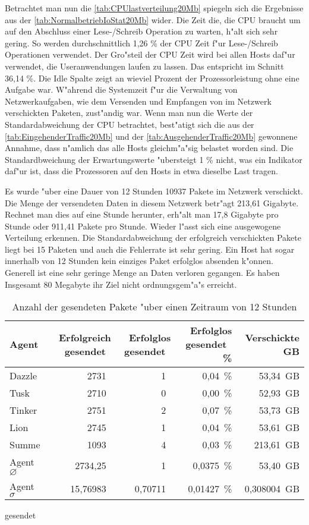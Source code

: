 Betrachtet man nun die \cref{tab:CPUlastverteilung20Mb} spiegeln sich die Ergebnisse aus der \cref{tab:NormalbetriebIoStat20Mb} wider. %
Die Zeit die, die CPU braucht um auf den Abschluss einer Lese-/Schreib Operation zu warten, h"alt sich sehr gering. %
So werden durchschnittlich 1,26 \% der CPU Zeit f"ur Lese-/Schreib Operationen verwendet. Der Gro"steil der CPU Zeit wird %
bei allen Hosts daf"ur verwendet, die Useranwendungen laufen zu lassen. Das entspricht im Schnitt 36,14 \%. Die Idle Spalte zeigt an wieviel Prozent der Prozessorleistung %
ohne eine Aufgabe war. W"ahrend die Systemzeit f"ur die Verwaltung von Netzwerkaufgaben, wie dem Versenden und Empfangen von %
im Netzwerk verschickten Paketen, zust"andig war. %
Wenn man nun die Werte der Standardabweichung der CPU betrachtet, best"atigt sich die aus der%
\cref{tab:EingehenderTraffic20Mb} und der \cref{tab:AusgehenderTraffic20Mb} gewonnene Annahme, dass n"amlich das alle Hosts gleichm"a"sig belastet worden sind. %
Die Standardbweichung der Erwartungswerte "ubersteigt 1 \% nicht, was ein Indikator daf"ur ist, dass die %
Prozessoren auf den Hosts in etwa dieselbe Last tragen.  

Es wurde "uber eine Dauer von 12 Stunden 10937 Pakete im Netzwerk verschickt. Die Menge der versendeten Daten in diesem Netzwerk betr"agt 213,61 Gigabyte. %
Rechnet man dies auf eine Stunde herunter, erh"alt man 17,8 Gigabyte pro Stunde oder 911,41 Pakete pro Stunde. Wieder l"asst sich eine ausgewogene Verteilung erkennen. %
Die Standardabweichung der erfolgreich verschickten Pakete liegt bei 15 Paketen und auch die Fehlerrate ist sehr gering. Ein Host %
hat sogar innerhalb von 12 Stunden kein einziges Paket erfolglos absenden k"onnen. Generell ist eine sehr geringe Menge an Daten verloren %
gegangen. Es haben Insgesamt 80 Megabyte ihr Ziel nicht ordnungsgem"a"s erreicht. %
\begin{table}
\centering
\begin{tabular}{l%
 r<{\,}%
 r<{\,}%
 r<{\,\%}%
 r<{\,GB}%
}
Agent  				& Erfolgreich gesendet			& Erfolglos gesendet			& Erfolglos gesendet	& Verschickte	\\
\hline
Dazzle 				& 2731			 		& 1					& 0,04			& 53,34			\\
Tusk 				& 2710					& 0					& 0,00			& 52,93			\\
Tinker				& 2751					& 2					& 0,07			& 53,73			\\
Lion				& 2745					& 1					& 0,04			& 53,61			\\ 
Summe				& 1093					& 4					& 0,03 			& 213,61		\\
Agent $\diameter $  		& 2734,25				& 1				 	& 0,0375		& 53,40 		\\   
Agent $\sigma $			& 15,76983	 			& 0,70711				& 0,01427      		& 0,308004		\\
\end{tabular}
gesendet\caption{Anzahl der gesendeten Pakete "uber einen Zeitraum von 12 Stunden}
\label{tab:VerschickteDaten20Mb}
\end{table}



